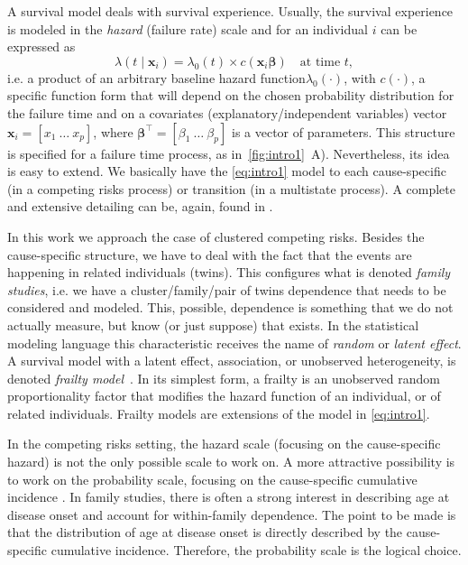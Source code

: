 A survival model deals with survival experience. Usually, the survival
experience is modeled in the \textit{hazard} (failure rate) scale and
for an individual \(i\) can be expressed as
\begin{equation}
  \lambda(t \mid \bm{x}_{i}) =
  \lambda_{0}(t) \times c(\bm{x}_{i} \bm{\beta})
  \quad \text{at time } t,
  \label{eq:intro1}
\end{equation}
i.e. a product of an arbitrary baseline hazard
function\(\lambda_{0}(\cdot)\), with \(c(\cdot)\), a specific function
form that will depend on the chosen probability distribution for the
failure time and on a covariates (explanatory/independent variables)
vector \(\bm{x}_{i} = [x_{1}~\dots~x_{p}]\), where \(\bm{\beta}^{\top} =
[\beta_{1}~\dots~\beta_{p}]\) is a vector of parameters. This structure
is specified for a failure time process, as in~\autoref{fig:intro1}~A).
Nevertheless, its idea is easy to extend. We basically have the
\autoref{eq:intro1} model to each cause-specific (in a competing risks
process) or transition (in a multistate process). A complete and
extensive detailing can be, again, found in .

In this work we approach the case of clustered competing risks. Besides
the cause-specific structure, we have to deal with the fact that the
events are happening in related individuals (twins). This configures
what is denoted \textit{family studies}, i.e. we have a
cluster/family/pair of twins dependence that needs to be considered and
modeled. This, possible, dependence is something that we do not actually
measure, but know (or just suppose) that exists. In the statistical
modeling language this characteristic receives the name of
\textit{random} or \textit{latent effect}. A survival model with a
latent effect, association, or unobserved heterogeneity, is denoted
\textit{frailty model}~\cite{frailty78, frailty79}. In its simplest
form, a frailty is an unobserved random proportionality factor that
modifies the hazard function of an individual, or of related
individuals. Frailty models are extensions of the model in
\autoref{eq:intro1}.

In the competing risks setting, the hazard scale (focusing on the
cause-specific hazard) is not the only possible scale to work on. A more
attractive possibility is to work on the probability scale, focusing on
the cause-specific cumulative incidence \cite{andersen12}. In family
studies, there is often a strong interest in describing age at disease
onset and account for within-family dependence. The point to be made is
that the distribution of age at disease onset is directly described by
the cause-specific cumulative incidence. Therefore, the probability
scale is the logical choice.

